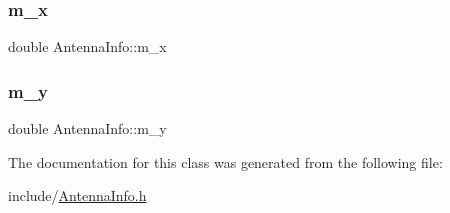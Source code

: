 \subsubsection{\texorpdfstring{m\_x}{m\_x}}
{\footnotesize\ttfamily double Antenna\+Info\+::m\+\_\+x\hspace{0.3cm}{\ttfamily [private]}}

\mbox{\label{class_antenna_info_a3a9ec27d75b8d2f0d750d64b7a2a3069}} 
\subsubsection{\texorpdfstring{m\_y}{m\_y}}
{\footnotesize\ttfamily double Antenna\+Info\+::m\+\_\+y\hspace{0.3cm}{\ttfamily [private]}}



The documentation for this class was generated from the following file\+:\begin{DoxyCompactItemize}
\item 
include/\mbox{\hyperlink{_antenna_info_8h}{Antenna\+Info.\+h}}\end{DoxyCompactItemize}

